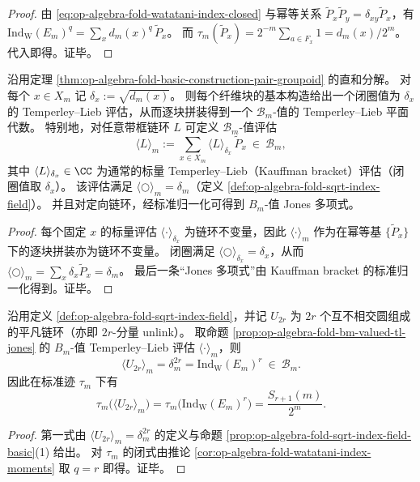 \begin{proof}
由 \eqref{eq:op-algebra-fold-watatani-index-closed} 与幂等关系 \(\widetilde P_x\widetilde P_y=\delta_{xy}\widetilde P_x\)，有
\(
\mathrm{Ind}_{\mathrm{W}}(E_m)^q=\sum_x d_m(x)^q\,\widetilde P_x
\)。
而 \(\tau_m(\widetilde P_x)=2^{-m}\sum_{a\in F_x}1=d_m(x)/2^m\)。
代入即得。证毕。
\end{proof}

\begin{proposition}\label{prop:op-algebra-fold-bm-valued-tl-jones}
沿用定理 \ref{thm:op-algebra-fold-basic-construction-pair-groupoid} 的直和分解。
对每个 \(x\in X_m\) 记
\(
\delta_x:=\sqrt{d_m(x)}
\)。
则每个纤维块的基本构造给出一个闭圈值为 \(\delta_x\) 的 Temperley--Lieb 评估，从而逐块拼装得到一个 \(\mathcal{B}_m\)-值的 Temperley--Lieb 平面代数。
特别地，对任意带框链环 \(L\) 可定义 \(\mathcal{B}_m\)-值评估
\[
\langle L\rangle_m:=\sum_{x\in X_m}\langle L\rangle_{\delta_x}\,\widetilde P_x\ \in\ \mathcal{B}_m,
\]
其中 \(\langle L\rangle_{\delta_x}\in\CC\) 为通常的标量 Temperley--Lieb（Kauffman bracket）评估（闭圈值取 \(\delta_x\)）。
该评估满足 \(\langle \bigcirc\rangle_m=\delta_m\)（定义 \ref{def:op-algebra-fold-sqrt-index-field}）。
并且对定向链环，经标准归一化可得到 \(B_m\)-值 Jones 多项式。
\end{proposition}
\begin{proof}
每个固定 \(x\) 的标量评估 \(\langle\cdot\rangle_{\delta_x}\) 为链环不变量，因此 \(\langle\cdot\rangle_m\) 作为在幂等基 \(\{\widetilde P_x\}\) 下的逐块拼装亦为链环不变量。
闭圈满足 \(\langle\bigcirc\rangle_{\delta_x}=\delta_x\)，从而
\(
\langle\bigcirc\rangle_m=\sum_x \delta_x\widetilde P_x=\delta_m
\)。
最后一条“Jones 多项式”由 Kauffman bracket 的标准归一化得到。证毕。
\end{proof}

\begin{corollary}\label{cor:op-algebra-fold-unlink-evaluates-to-collision-moment}
沿用定义 \ref{def:op-algebra-fold-sqrt-index-field}，并记 \(U_{2r}\) 为 \(2r\) 个互不相交圆组成的平凡链环（亦即 \(2r\)-分量 unlink）。
取命题 \ref{prop:op-algebra-fold-bm-valued-tl-jones} 的 \(B_m\)-值 Temperley--Lieb 评估 \(\langle\cdot\rangle_m\)，则
\[
\langle U_{2r}\rangle_m=\delta_m^{2r}=\mathrm{Ind}_{\mathrm W}(E_m)^{r}\ \in\ \mathcal{B}_m.
\]
因此在标准迹 \(\tau_m\) 下有
\[
\tau_m\!\bigl(\langle U_{2r}\rangle_m\bigr)
=\tau_m\!\bigl(\mathrm{Ind}_{\mathrm W}(E_m)^{r}\bigr)
=\frac{S_{r+1}(m)}{2^m}.
\]
\end{corollary}
\begin{proof}
第一式由 \(\langle U_{2r}\rangle_m=\delta_m^{2r}\) 的定义与命题 \ref{prop:op-algebra-fold-sqrt-index-field-basic}(1) 给出。
对 \(\tau_m\) 的闭式由推论 \ref{cor:op-algebra-fold-watatani-index-moments} 取 \(q=r\) 即得。证毕。
\end{proof}

